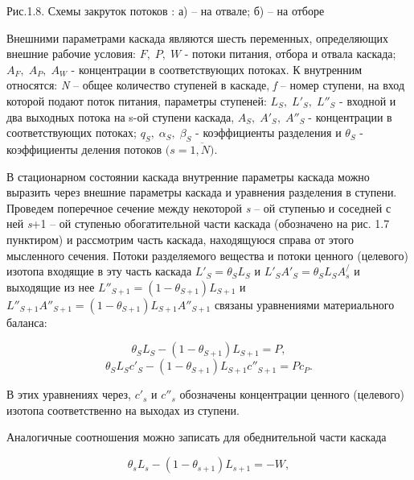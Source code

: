 \noindent 

Рис.1.8. Схемы закруток потоков : а) -- на отвале; б) -- на отборе



Внешними параметрами каскада являются шесть переменных, определяющих внешние рабочие условия: $F,\; P,\; W$ - потоки питания, отбора и отвала каскада; $A_{F} ,\; A_{P} ,\; A_{W}$ - концентрации в соответствующих потоках. К внутренним относятся: \textit{N} -- общее количество ступеней в каскаде, \textit{f} -- номер ступени, на вход которой подают поток питания, параметры ступеней: $L_{S} ,\; L'_{S} ,\; L''_{S} $ - входной и два выходных потока на s-ой ступени каскада, $A_{S} ,\; A'_{S} ,\; A''_{S} \; $- концентрации в соответствующих потоках; $q_{S} ,\; \alpha _{S} ,\; \beta _{S} $ - коэффициенты разделения и $\theta _{S} $ - коэффициенты деления потоков $(s=\overline{1,N)}$.

В стационарном состоянии каскада внутренние параметры каскада можно выразить через внешние параметры каскада и уравнения разделения в ступени. Проведем поперечное сечение между некоторой \textit{s} -- ой ступенью и соседней с ней \textit{s}+1 -- ой ступенью обогатительной части каскада (обозначено на рис. 1.7 пунктиром) и рассмотрим часть каскада, находящуюся справа от этого мысленного сечения. Потоки разделяемого вещества и потоки ценного (целевого) изотопа входящие в эту часть каскада $L'_{S} =\theta _{S} L_{S} $ и $L'_{S} A'_{S} =\theta _{S} L_{S} A_{s}^{/} $ и выходящие из нее $L''_{S+1} =(1-\theta _{S+1} )L_{S+1} $ и $L''_{S+1} A''_{S+1} =(1-\theta _{S+1} )L_{S+1} A''_{S+1} $ связаны уравнениями материального баланса:

\begin{equation} \label{GrindEQ__1_71_} 
\theta _{S} L_{S} -(1-\theta _{S+1} )L_{S+1} =P,                
\end{equation} 
\begin{equation} \label{GrindEQ__1_72_} 
\theta _{S} L_{S} c'_{S} -(1-\theta _{S+1} )L_{S+1} c''_{S+1} =Pc_{P}.     
\end{equation} 

В этих уравнениях через, $c'_{s}$ и $c''_{s}$ обозначены концентрации ценного (целевого) изотопа соответственно на выходах из ступени.

Аналогичные соотношения можно записать для обеднительной части каскада

\begin{equation} \label{GrindEQ__1_73_} 
  \theta _{s} L_{s} -(1-\theta _{s+1} )L_{s+1} =-W, 
\end{equation}

